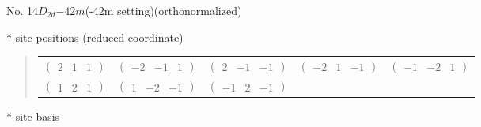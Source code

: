 \documentclass[fleqn,9pt,landscape]{jsarticle}
\begin{document}
\newpage
\begin{center}
\LARGE
No. 14\quad$D_{2d}$\quad$-42m$\quad(-42m setting)\quad[ tetragonal ] (orthonormalized)
\end{center}
\vspace{5mm}
* site positions (reduced coordinate)
\begin{quote}
\begin{tabular}{ccccc}
$ \begin{pmatrix} 2 & 1 & 1 \end{pmatrix} $ & $ \begin{pmatrix} -2 & -1 & 1 \end{pmatrix} $ & $ \begin{pmatrix} 2 & -1 & -1 \end{pmatrix} $ & $ \begin{pmatrix} -2 & 1 & -1 \end{pmatrix} $ & $ \begin{pmatrix} -1 & -2 & 1 \end{pmatrix} $ \\
$ \begin{pmatrix} 1 & 2 & 1 \end{pmatrix} $ & $ \begin{pmatrix} 1 & -2 & -1 \end{pmatrix} $ & $ \begin{pmatrix} -1 & 2 & -1 \end{pmatrix} $ & $  $ & $  $
\end{tabular}
\end{quote}
* site basis
\end{document}
